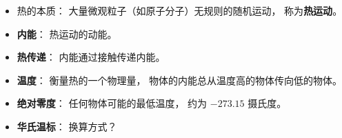
\begin{issues}
\issueDraft
\end{issues}

\begin{itemize}
\item 热的本质： 大量微观粒子（如原子分子）无规则的随机运动， 称为\textbf{热运动}。
\item \textbf{内能}： 热运动的动能。
\item \textbf{热传递}： 内能通过接触传递内能。
\item \textbf{温度}： 衡量热的一个物理量， 物体的内能总从温度高的物体传向低的物体。
\item \textbf{绝对零度}： 任何物体可能的最低温度， 约为 $-273.15$ 摄氏度。
\item \textbf{华氏温标}： 换算方式？
\end{itemize}
